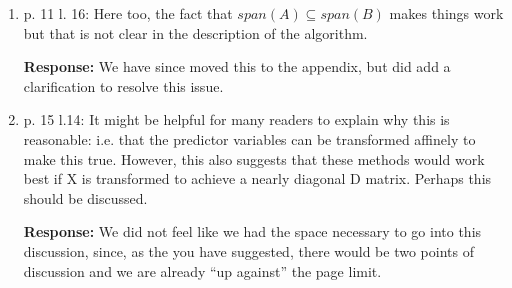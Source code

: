 \documentclass[11pt]{article}
\begin{document}
\begin{enumerate}
\item p. 11 l. 16: Here too, the fact that $span(A) \subseteq span(B)$ makes things work but that is not clear in the description of the algorithm.

\textbf{Response:} We have since moved this to the appendix, but did add a clarification to resolve this issue.

\item p. 15 l.14: It might be helpful for many readers to explain why this is reasonable: i.e. that the predictor variables can be transformed affinely to make this true. However, this also suggests that these methods would work best if X is transformed to achieve a nearly diagonal D matrix. Perhaps this should be discussed.

\textbf{Response:} We did not feel like we had the space necessary to go into this discussion, since, as the you have suggested, there would be two points of discussion and we are already ``up against'' the page limit.

\end{enumerate}
\end{document}
